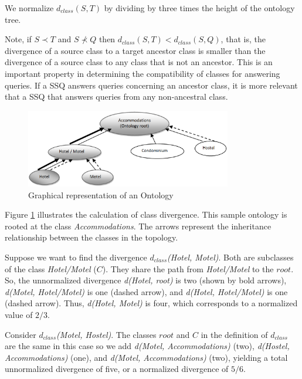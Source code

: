 \documentclass{www2010-submission}
\begin{document}
We normalize $d_{class}(S, T)$ by dividing by three times the height of the ontology tree.

Note, if $S \prec T$ and $S \not\prec Q$ then $d_{class}(S,T) < d_{class}(S,Q)$,
that is, the divergence of a source class to a target ancestor class is smaller than the divergence of a source class to any class that is not an ancestor. This is an important property in determining the compatibility of classes for answering queries.  If a SSQ answers queries concerning an ancestor class, it is more relevant that a SSQ that answers queries from any non-ancestral class. 

\begin{figure}[t]
\centering
\includegraphics[width=90mm]{class_divergence.eps}
\caption{Graphical representation of an Ontology}
\label{fig:class_divergence}
\end{figure}

Figure \ref{fig:class_divergence} illustrates the calculation of class divergence. This sample ontology is rooted at the class \textit{Accommodations}. The arrows represent the inheritance relationship between the classes in the topology.

Suppose we want to find the divergence $d_{class}$\textit{(Hotel, Motel)}. Both are subclasses of the class \textit{Hotel/Motel} ($C$). They share the path from \textit{Hotel/Motel} to the $root$. So, the unnormalized divergence \textit{d(Hotel, root)} is two (shown by bold arrows), \textit{d(Motel, Hotel/Motel)} is one (dashed arrow), and \textit{d(Hotel, Hotel/Motel)} is one (dashed arrow). Thus, \textit{d(Hotel, Motel)} is four, which corresponds to a normalized value of $2/3$. 

Consider $d_{class}$\textit{(Motel, Hostel)}. The classes $root$ and $C$ in the definition of $d_{class}$ are the same in this case so we add \textit{d(Motel, Accommodations)} (two), \textit{d(Hostel, Accommodations)} (one), and \textit{d(Motel, Accommodations)} (two), yielding a total unnormalized divergence of five, or a normalized divergence of $5/6$.


\end{document}
